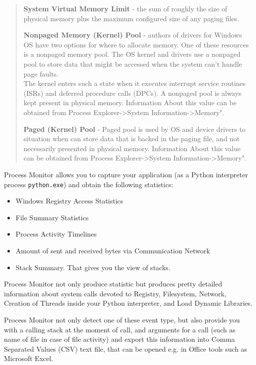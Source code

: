 \documentclass[
]{article}
\begin{document}
\begin{quote}
\textbf{System Virtual Memory Limit} - the sum of roughly the size of
physical memory plus the maximum configured size of any paging files.

\textbf{Nonpaged Memory (Kernel) Pool} - authors of drivers for Windows
OS have two options for where to allocate memory. One of these resources
is a nonpaged memory pool. The OS kernel and drivers use a nonpaged pool
to store data that might be accessed when the system can't handle page
faults. \\
The kernel enters such a state when it executes interrupt service
routines (ISRs) and deferred procedure calls (DPCs). A nonpaged pool is
always kept present in physical memory. Information About this value can
be obtained from Process Explorer-\textgreater System
Information-\textgreater Memory".

\textbf{Paged (Kernel) Pool} - Paged pool is used by OS and device
drivers to situation when can store data that is backed in the paging
file, and not necessarily presented in physical memory. Information
About this value can be obtained from Process
Explorer-\textgreater System Information-\textgreater Memory".
\end{quote}

Process Monitor allows you to capture your application (as a Python
interpreter process \texttt{python.exe}) and obtain the following
statistics:

\begin{itemize}
\item
  Windows Registry Access Statistics
\item
  File Summary Statistics
\item
  Process Activity Timelines
\item
  Amount of sent and received bytes via Communication Network
\item
  Stack Summary. That gives you the view of stacks.
\end{itemize}

Process Monitor not only produce statistic but produces pretty detailed
information about system calls devoted to Registry, Filesystem, Network,
Creation of Threads inside your Python interpreter, and Load Dynamic
Libraries.

Process Monitor not only detect one of these event type, but also
provide you with a calling stack at the moment of call, and arguments
for a call (such as name of file in case of file activity) and export
this information into Comma Separated Values (CSV) text file, that can
be opened e.g. in Office tools such as Microsoft Excel.
\end{document}
